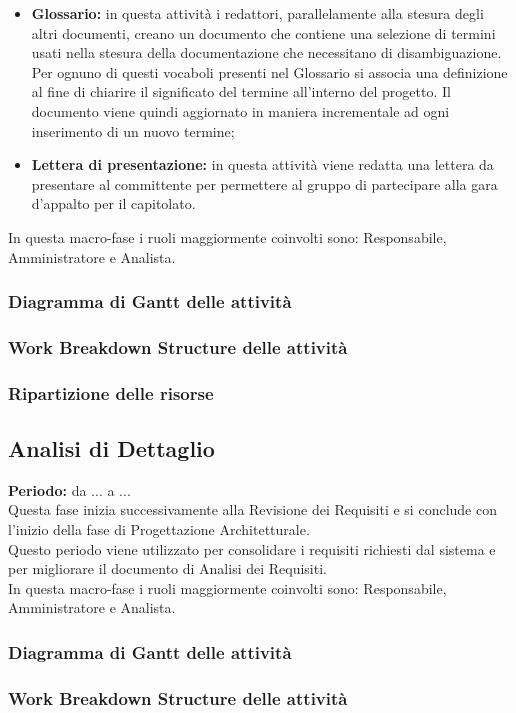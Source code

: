 \begin{itemize}
		\item \textbf{Glossario:} in questa attività i redattori, parallelamente alla stesura degli altri documenti, creano un documento che contiene una selezione di termini usati nella stesura della documentazione che necessitano di disambiguazione. Per ognuno di questi vocaboli presenti nel Glossario si associa una definizione al fine di chiarire il significato del termine all'interno del progetto. Il documento viene quindi aggiornato in maniera incrementale ad ogni inserimento di un nuovo termine; \\
		\item \textbf{Lettera di presentazione:} in questa attività viene redatta una lettera da presentare al committente per permettere al gruppo di partecipare alla gara d'appalto per il capitolato. \\
	\end{itemize}
	In questa macro-fase i ruoli maggiormente coinvolti sono: Responsabile, Amministratore e Analista.
\subsubsection{Diagramma di Gantt delle attività}
\subsubsection{Work Breakdown Structure delle attività}
\subsubsection{Ripartizione delle risorse}
\subsection{Analisi di Dettaglio}
	\textbf{Periodo:} da ... a ... \\
	Questa fase inizia successivamente alla Revisione dei Requisiti e si conclude con l'inizio della fase di Progettazione Architetturale. \\
	Questo periodo viene utilizzato per consolidare i requisiti richiesti dal sistema e per
migliorare il documento di Analisi dei Requisiti. \\
	In questa macro-fase i ruoli maggiormente coinvolti sono: Responsabile, Amministratore e Analista.
\subsubsection{Diagramma di Gantt delle attività}
\subsubsection{Work Breakdown Structure delle attività}
